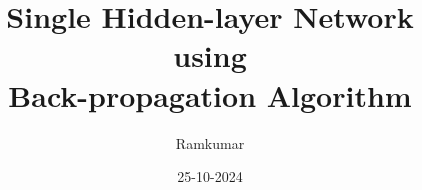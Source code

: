 \documentclass{beamer}
\title[single hidden layer network]{Single Hidden-layer Network \\ using \\ Back-propagation Algorithm}
\date{25-10-2024}
\author[Ramkumar]{Ramkumar}
\begin{document}
\frame{\maketitle}


\end{document}
